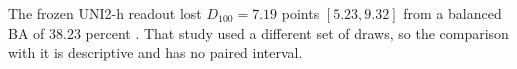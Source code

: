\documentclass[11pt]{article}
\begin{document}
The frozen UNI2-h readout lost $D_{100}=7.19$ points $[5.23, 9.32]$ from a balanced BA of 38.23 percent \citep{queisler2026encoderTransfer}. That study used a different set of draws, so the comparison with it is descriptive and has no paired interval.





\end{document}
